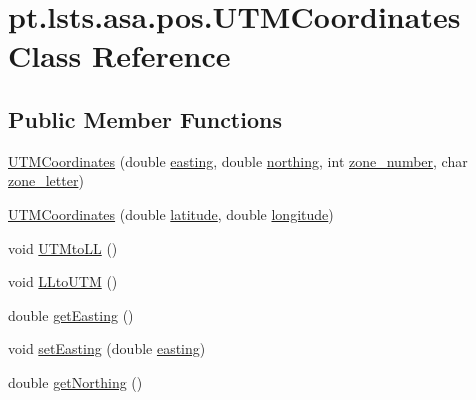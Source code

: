 \hypertarget{classpt_1_1lsts_1_1asa_1_1pos_1_1UTMCoordinates}{}\section{pt.\+lsts.\+asa.\+pos.\+U\+T\+M\+Coordinates Class Reference}
\label{classpt_1_1lsts_1_1asa_1_1pos_1_1UTMCoordinates}
\subsection*{Public Member Functions}
\begin{DoxyCompactItemize}
\item 
\hyperlink{classpt_1_1lsts_1_1asa_1_1pos_1_1UTMCoordinates_abbcf0f370ecb55687a43b0a144fab6c5}{U\+T\+M\+Coordinates} (double \hyperlink{classpt_1_1lsts_1_1asa_1_1pos_1_1UTMCoordinates_a508f46c459b0b1eacb4d7949412e8603}{easting}, double \hyperlink{classpt_1_1lsts_1_1asa_1_1pos_1_1UTMCoordinates_a67e32d6d5f1e61c42c06ebb06e3223ac}{northing}, int \hyperlink{classpt_1_1lsts_1_1asa_1_1pos_1_1UTMCoordinates_a90bf03e81ee88041f7831e0b6a6bc08c}{zone\+\_\+number}, char \hyperlink{classpt_1_1lsts_1_1asa_1_1pos_1_1UTMCoordinates_a8677ce9f27943bc0beec8797559338a5}{zone\+\_\+letter})
\item 
\hyperlink{classpt_1_1lsts_1_1asa_1_1pos_1_1UTMCoordinates_a58b13372b7fc85e7c814a46518d7f342}{U\+T\+M\+Coordinates} (double \hyperlink{classpt_1_1lsts_1_1asa_1_1pos_1_1UTMCoordinates_aad153e29fa181fa437b3dbdb493651fd}{latitude}, double \hyperlink{classpt_1_1lsts_1_1asa_1_1pos_1_1UTMCoordinates_a408c6bf75745de5c290f77e65948ea2d}{longitude})
\item 
void \hyperlink{classpt_1_1lsts_1_1asa_1_1pos_1_1UTMCoordinates_a8ad0b721b01ba175ff021e1ce5e9632b}{U\+T\+Mto\+L\+L} ()
\item 
void \hyperlink{classpt_1_1lsts_1_1asa_1_1pos_1_1UTMCoordinates_aa37e3f855345a999c7bb3270ac0be6a1}{L\+Lto\+U\+T\+M} ()
\item 
double \hyperlink{classpt_1_1lsts_1_1asa_1_1pos_1_1UTMCoordinates_a5b0a12c9f6f7c6ccd5576cf41ff4d0a6}{get\+Easting} ()
\item 
void \hyperlink{classpt_1_1lsts_1_1asa_1_1pos_1_1UTMCoordinates_a1a2a20f62de9ed6c9976dff755b215bf}{set\+Easting} (double \hyperlink{classpt_1_1lsts_1_1asa_1_1pos_1_1UTMCoordinates_a508f46c459b0b1eacb4d7949412e8603}{easting})
\item 
double \hyperlink{classpt_1_1lsts_1_1asa_1_1pos_1_1UTMCoordinates_a509cbb8e2470ae396ff2a261f2fc9857}{get\+Northing} ()

\end{DoxyCompactItemize}
